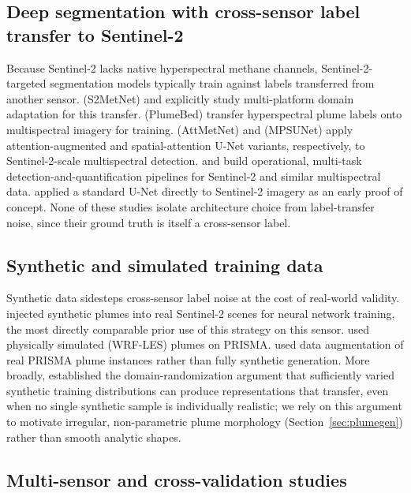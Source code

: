 \documentclass[10pt,twocolumn]{article}
\begin{document}
\subsection{Deep segmentation with cross-sensor label transfer to Sentinel-2}

Because Sentinel-2 lacks native hyperspectral methane channels, Sentinel-2-targeted segmentation models typically train against labels transferred from another sensor. \citet{mateogarcia2023s2metnet} (S2MetNet) and \citet{mateogarcia2025multiplatform} explicitly study multi-platform domain adaptation for this transfer. \citet{sherwin2025plumebed} (PlumeBed) transfer hyperspectral plume labels onto multispectral imagery for training. \citet{martinez2025attmetnet} (AttMetNet) and \citet{li2025mpsunet} (MPSUNet) apply attention-augmented and spatial-attention U-Net variants, respectively, to Sentinel-2-scale multispectral detection. \citet{karimi2025advanced} and \citet{jiang2024unlocking} build operational, multi-task detection-and-quantification pipelines for Sentinel-2 and similar multispectral data. \citet{dubaret2023methaneunet} applied a standard U-Net directly to Sentinel-2 imagery as an early proof of concept. None of these studies isolate architecture choice from label-transfer noise, since their ground truth is itself a cross-sensor label.

\subsection{Synthetic and simulated training data}

Synthetic data sidesteps cross-sensor label noise at the cost of real-world validity. \citet{rodriguezcuenca2023synthetic} injected synthetic plumes into real Sentinel-2 scenes for neural network training, the most directly comparable prior use of this strategy on this sensor. \citet{joyce2023deep} used physically simulated (WRF-LES) plumes on PRISMA. \citet{irakulisloitxate2022prisma} used data augmentation of real PRISMA plume instances rather than fully synthetic generation. More broadly, \citet{tobin2017domain} established the domain-randomization argument that sufficiently varied synthetic training distributions can produce representations that transfer, even when no single synthetic sample is individually realistic; we rely on this argument to motivate irregular, non-parametric plume morphology (Section~\ref{sec:plumegen}) rather than smooth analytic shapes.

\subsection{Multi-sensor and cross-validation studies}
\end{document}
